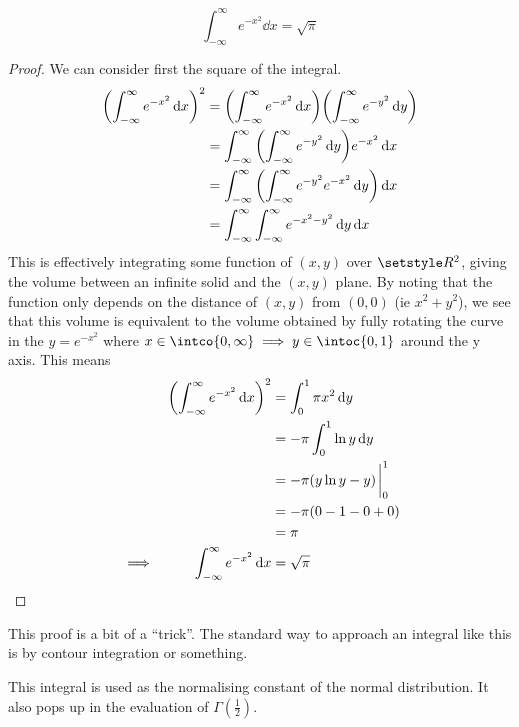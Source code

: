 \begin{theorem} \label{thm_gauss_integral}
\begin{equation*}
\int_{-\infty}^\infty e^{-x^2} \dd{x} = \sqrt \pi
\end{equation*}
\end{theorem}
\begin{proof}
We can consider first the square of the integral.
\begin{align*}
\pqty{\int_{-\infty}^\infty e^{-x^2} \dd{x}}^2
    &= \pqty{\int_{-\infty}^\infty e^{-x^2} \dd{x}}
       \pqty{\int_{-\infty}^\infty e^{-y^2} \dd{y}} \\
    &= \int_{-\infty}^\infty
                   \pqty{\int_{-\infty}^\infty e^{-y^2} \dd{y}}
               e^{-x^2} \dd{x} \\
    &= \int_{-\infty}^\infty
           \pqty{\int_{-\infty}^\infty e^{-y^2} e^{-x^2} \dd{y}} \dd{x} \\
    &= \int_{-\infty}^\infty
           \int_{-\infty}^\infty e^{-x^2-y^2} \dd{y} \dd{x}
\end{align*}
This is effectively integrating some function of \((x, y)\) over
\(\Reals^2\), giving the volume between an infinite solid and the \((x, y)\)
plane. By noting that the function only depends on the distance of
\((x, y)\) from \((0, 0)\) (ie \(x^2 + y^2\)), we see that this volume is
equivalent to the volume obtained by fully rotating the curve in the
\(y = e^{-x^2}\) where
\(x \in \intco{0, \infty} \implies y \in \intoc{0, 1}\) around the y axis.
This means
\begin{alignat*}{2}
&& \pqty{\int_{-\infty}^\infty e^{-x^2} \dd{x}}^2
    &= \int_0^1 \pi x^2 \dd{y} \\
&&  &= -\pi \int_0^1 \ln y \dd{y} \\
&&  &= -\pi (y\ln y - y)\eval_0^1 \\
&&  &= -\pi \pqty{0 - 1 - 0 + 0} \\
&&  &= \pi \\
&\implies& \int_{-\infty}^\infty e^{-x^2} \dd{x}
    &= \sqrt \pi \qedhere
\end{alignat*}
\end{proof}
This proof is a bit of a ``trick''. The standard way to approach an integral
like this is by contour integration or something.

This integral is used as the normalising constant of the normal
distribution. It also pops up in the evaluation of \(\Gamma(\frac 12)\).

